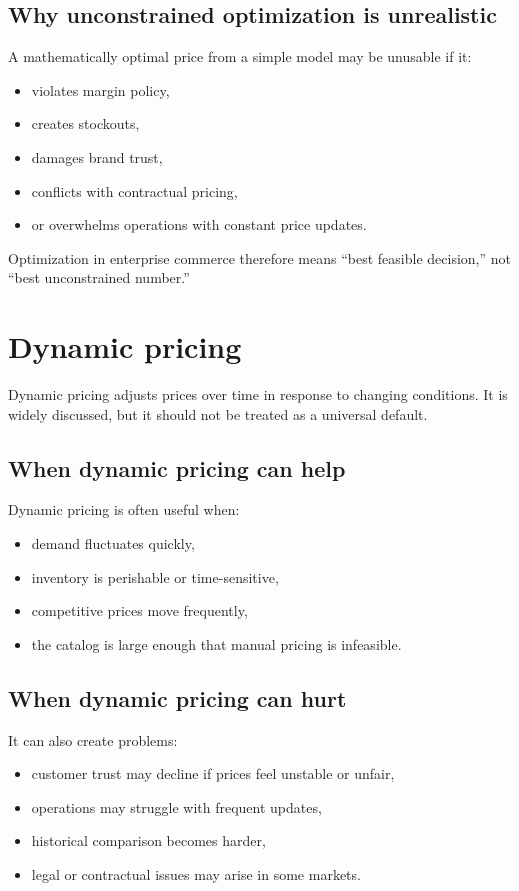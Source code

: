\subsection{Why unconstrained optimization is unrealistic}
A mathematically optimal price from a simple model may be unusable if it:
\begin{itemize}
  \item violates margin policy,
  \item creates stockouts,
  \item damages brand trust,
  \item conflicts with contractual pricing,
  \item or overwhelms operations with constant price updates.
\end{itemize}

Optimization in enterprise commerce therefore means ``best feasible decision,'' not ``best unconstrained number.''

\section{Dynamic pricing}
Dynamic pricing adjusts prices over time in response to changing conditions.
It is widely discussed, but it should not be treated as a universal default.

\subsection{When dynamic pricing can help}
Dynamic pricing is often useful when:
\begin{itemize}
  \item demand fluctuates quickly,
  \item inventory is perishable or time-sensitive,
  \item competitive prices move frequently,
  \item the catalog is large enough that manual pricing is infeasible.
\end{itemize}

\subsection{When dynamic pricing can hurt}
It can also create problems:
\begin{itemize}
  \item customer trust may decline if prices feel unstable or unfair,
  \item operations may struggle with frequent updates,
  \item historical comparison becomes harder,
  \item legal or contractual issues may arise in some markets.
\end{itemize}

